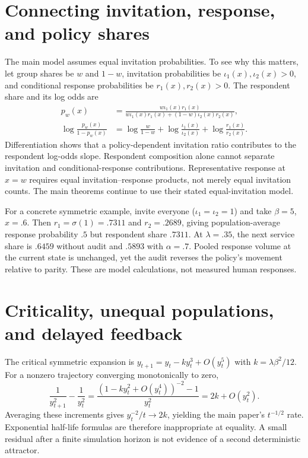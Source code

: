 \section{Connecting invitation, response, and policy shares}\label{app:calibration}
The main model assumes equal invitation probabilities. To see why this matters, let group shares be $w$ and $1-w$, invitation probabilities be $\iota_1(x),\iota_2(x)>0$, and conditional response probabilities be $r_1(x),r_2(x)>0$. The respondent share and its log odds are
\begin{align*}
p_w(x)&=\frac{w\iota_1(x)r_1(x)}{w\iota_1(x)r_1(x)+(1-w)\iota_2(x)r_2(x)},\\
\log\frac{p_w(x)}{1-p_w(x)}&=\log\frac{w}{1-w}+\log\frac{\iota_1(x)}{\iota_2(x)}+\log\frac{r_1(x)}{r_2(x)}.
\end{align*}
Differentiation shows that a policy-dependent invitation ratio contributes to the respondent log-odds slope. Respondent composition alone cannot separate invitation and conditional-response contributions. Representative response at $x=w$ requires equal invitation--response products, not merely equal invitation counts. The main theorems continue to use their stated equal-invitation model.

For a concrete symmetric example, invite everyone ($\iota_1=\iota_2=1$) and take $\beta=5$, $x=.6$. Then $r_1=\sigma(1)=.7311$ and $r_2=.2689$, giving population-average response probability $.5$ but respondent share $.7311$. At $\lambda=.35$, the next service share is $.6459$ without audit and $.5893$ with $\alpha=.7$. Pooled response volume at the current state is unchanged, yet the audit reverses the policy's movement relative to parity. These are model calculations, not measured human responses.

\section{Criticality, unequal populations, and delayed feedback}\label{app:boundaries}
The critical symmetric expansion is $y_{t+1}=y_t-ky_t^3+O(y_t^5)$ with $k=\lambda\beta^2/12$. For a nonzero trajectory converging monotonically to zero,
\[
\frac{1}{y_{t+1}^2}-\frac{1}{y_t^2}
=\frac{(1-ky_t^2+O(y_t^4))^{-2}-1}{y_t^2}=2k+O(y_t^2).
\]
Averaging these increments gives $y_t^{-2}/t\to2k$, yielding the main paper's $t^{-1/2}$ rate. Exponential half-life formulas are therefore inappropriate at equality. A small residual after a finite simulation horizon is not evidence of a second deterministic attractor.

